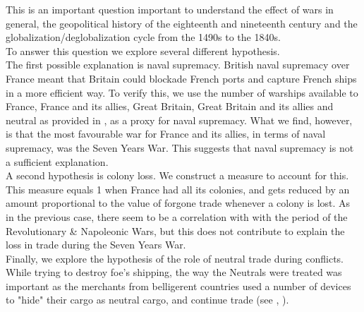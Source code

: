 \documentclass[12pt,a4paper,notitlepage]{article}
\begin{document}
This is an important question important to understand the effect of wars in general, the geopolitical history of the eighteenth and nineteenth century and the globalization/deglobalization cycle from the 1490s to the 1840s. \\
To answer this question we explore several different hypothesis. \\
The first possible explanation is naval supremacy.
British naval supremacy over France meant that Britain could blockade French ports and capture French ships in a more efficient way.
To verify this, we use the number of warships available to France, France and its allies, Great Britain, Great Britain and its allies and neutral as provided in \cite{modelski1988seapower}, as a proxy for naval supremacy.
What we find, however, is that the most favourable war for France and its allies, in terms of naval supremacy, was the Seven Years War.
This suggests that naval supremacy is not a sufficient explanation. \\ 
A second hypothesis is colony loss. We construct a measure to account for this.
This measure equals 1 when France had all its colonies, and gets reduced by an amount proportional to the value of forgone trade whenever a colony is lost.
As in the previous case, there seem to be a correlation with with the period of the Revolutionary \& Napoleonic Wars, but this does not contribute to explain the loss in trade during the Seven Years War. \\
Finally, we explore the hypothesis of the role of neutral trade during conflicts. 
While trying to destroy foe's shipping, the way the Neutrals were treated was important as the merchants from belligerent countries used a number of devices to "hide" their cargo as neutral cargo, and continue trade (see \citep{carriere1973negociants}, \cite{schnakenbourg2013guerre}). 
\end{document}
